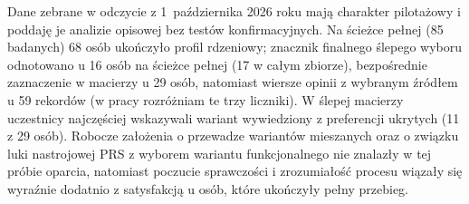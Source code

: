 Dane zebrane w odczycie z 1~października 2026 roku mają charakter pilotażowy i poddaję je analizie opisowej bez testów konfirmacyjnych. Na ścieżce pełnej (85 badanych) 68 osób ukończyło profil rdzeniowy; znacznik finalnego ślepego wyboru odnotowano u 16 osób na ścieżce pełnej (17 w całym zbiorze), bezpośrednie zaznaczenie w macierzy u 29 osób, natomiast wiersze opinii z wybranym źródłem u 59 rekordów (w pracy rozróżniam te trzy liczniki). W ślepej macierzy uczestnicy najczęściej wskazywali wariant wywiedziony z preferencji ukrytych (11 z 29 osób). Robocze założenia o przewadze wariantów mieszanych oraz o związku luki nastrojowej PRS z wyborem wariantu funkcjonalnego nie znalazły w tej próbie oparcia, natomiast poczucie sprawczości i zrozumiałość procesu wiązały się wyraźnie dodatnio z satysfakcją u osób, które ukończyły pełny przebieg.


